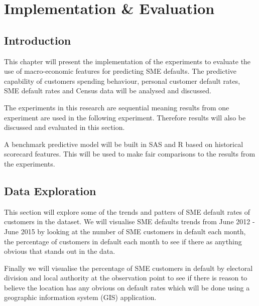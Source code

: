 
\chapter{Implementation \& Evaluation} %

\label{Chapter5} %


\section{Introduction}
This chapter will present the implementation of the experiments to evaluate the use of macro-economic features for predicting SME defaults. The predictive capability of customers spending behaviour, personal customer default rates, SME default rates and Census data  will be analysed and discussed.

The experiments in this research are sequential meaning results from one experiment are used in the following experiment. Therefore results will also be discussed and evaluated in this section.

A benchmark predictive model will be built in SAS and R based on historical scorecard features. This will be used to make fair comparisons to the results from the experiments.


\section{Data Exploration}\label{sec:Dataexplor}

This section will explore some of the trends and patters of SME default rates of customers in the dataset. We will visualise SME defaults trends from June 2012 - June 2015 by looking at the number of SME customers in default each month, the percentage of customers in default each month to see if there as anything obvious that stands out in the data. 

Finally we will visualise the percentage of SME customers in default by electoral division and local authority at the observation point to see if there is reason to believe the location has any obvious on default rates which will be done using a geographic information system (GIS) application.

